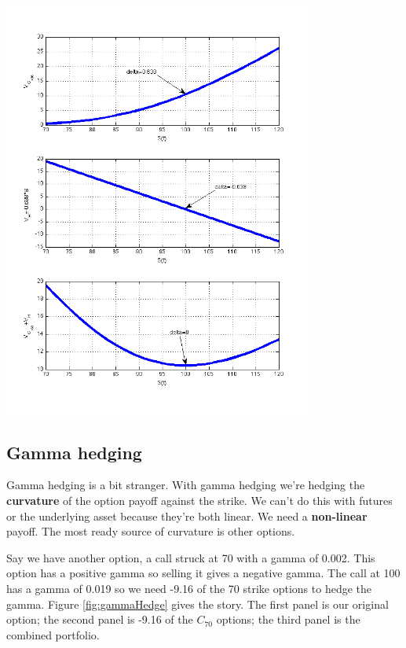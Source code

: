   \begin{center}
\includegraphics[width=4in]{pics/deltaHedge}%
\label{fig:deltaHedge}%
\end{center}


\subsection{Gamma hedging}

Gamma hedging is a bit stranger. With gamma hedging we're hedging the \textbf{curvature} of the option payoff against the strike. We can't do this with futures or the underlying asset because they're both linear. We need a \textbf{non-linear} payoff. The most ready source of curvature is other options.  

Say we have another option, a call struck at 70 with a gamma of 0.002. This option has a positive gamma so selling it gives a negative gamma. The call at 100 has a gamma of 0.019 so we need -9.16 of the 70 strike options to hedge the gamma. Figure \ref{fig:gammaHedge} gives the story. The first panel is our original option; the second panel is -9.16 of the $C_{70}$ options; the third panel is the combined portfolio.


